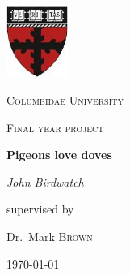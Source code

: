 \documentclass[12pt,a4paper]{report}
\begin{document}
\begin{titlepage}
	\centering
	\includegraphics[width=0.15\textwidth]{seas}\par\vspace{1cm}
	{\scshape\LARGE Columbidae University \par}
	\vspace{1cm}
	{\scshape\Large Final year project\par}
	\vspace{1.5cm}
	{\huge\bfseries Pigeons love doves\par}
	\vspace{2cm}
	{\Large\itshape John Birdwatch\par}
	\vfill
	supervised by\par
	Dr.~Mark \textsc{Brown}

	\vfill

	{\large \today\par}
\end{titlepage}
\end{document}
